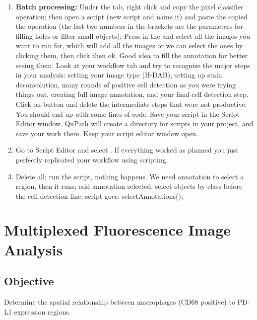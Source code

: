 \documentclass[a4paper,12pt]{article}
\begin{document}
\begin{enumerate}
    \item \textbf{Batch processing:} Under the \soln {} \solnend tab, right click and copy the pixel classifier operation; then open a script (new script and name it) and paste the copied the operation (the last two numbers in the brackets are the parameters for filling holes or filter small objects); Press \soln {} \solnend in the \soln {} \solnend and select all the images you want to run for, which will add all the images or we can select the ones by clicking them, then click then ok. Good idea to fill the annotation for better seeing them. Look at your workflow tab and try to recognize the major steps in your analysis: setting your image type (H-DAB), setting up stain deconvolution, many rounds of positive cell detection as you were trying things out, creating full image annotation, and your final cell detection step. Click on \soln {} \solnend button and delete the intermediate steps that were not productive. You should end up with some lines of code. Save your script \soln {} \solnend in the Script Editor window. QuPath will create a directory for scripts in your project, and save your work there. Keep your script editor window open.
    \item Go to Script Editor and select \soln {} \solnend. If everything worked as planned you just perfectly replicated your workflow using scripting. \item Delete all; run the script, nothing happens. We need annotation to select a region, then it runs; add annotation selected; select objects by class before the cell detection line; script goes: selectAnnotations(); 
\end{enumerate}

\section{Multiplexed Fluorescence Image Analysis}
\subsection{Objective}
Determine the spatial relationship between macrophages (CD68 positive) to PD-L1 expression regions.
\end{document}
